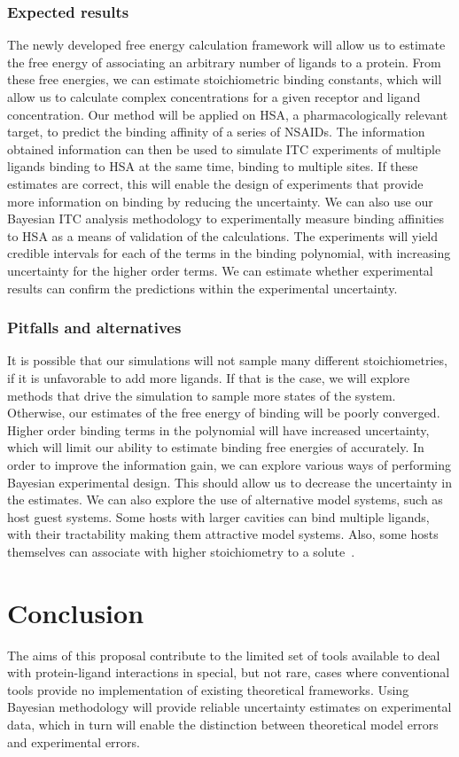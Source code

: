 \documentclass[10pt,final]{article}
\begin{document}
\subsubsection*{Expected results}
The newly developed free energy calculation framework will allow us to estimate the free energy of associating an arbitrary number of ligands to a protein.
%
From these free energies, we can estimate stoichiometric binding constants, which will allow us to calculate complex concentrations for a given receptor and ligand concentration.
%
Our method will be applied on HSA, a pharmacologically relevant target, to predict the binding affinity of a series of NSAIDs. 
%
The information obtained information can then be used to simulate ITC experiments of multiple ligands binding to HSA at the same time, binding to multiple sites.
%
If these estimates are correct, this will enable the design of experiments that provide more information on binding by reducing the uncertainty.
%
We can also use our Bayesian ITC analysis methodology to experimentally measure binding affinities to HSA as a means of validation of the calculations.
%
The experiments will yield credible intervals for each of the terms in the binding polynomial, with increasing uncertainty for the higher order terms.
%
We can estimate whether experimental results can confirm the predictions within the experimental uncertainty.

\subsubsection*{Pitfalls and alternatives}
It is possible that our simulations will not sample many different stoichiometries, if it is unfavorable to add more ligands.
%
If that is the case, we will explore methods that drive the simulation to sample more states of the system.
%
Otherwise, our estimates of the free energy of binding will be poorly converged.
%
Higher order binding terms in the polynomial will have increased uncertainty, which will limit our ability to estimate binding free energies of accurately.
%
In order to improve the information gain, we can explore various ways of performing Bayesian experimental design.
%
This should allow us to decrease the uncertainty in the estimates.
%
We can also explore the use of alternative model systems, such as host guest systems. 
%
Some hosts with larger cavities can bind multiple ligands, with their tractability making them attractive model systems.
%
Also, some hosts themselves can associate with higher stoichiometry to a solute~\autocite{Armstrong1986a}.

\section*{Conclusion}
The aims of this proposal contribute to the limited set of tools available to deal with protein-ligand interactions in special, but not rare, cases where conventional tools provide no implementation of existing theoretical frameworks. Using Bayesian methodology will provide reliable uncertainty estimates on experimental data, which in turn will enable the distinction between theoretical model errors and experimental errors.

\setlength{\emergencystretch}{1em}
\printbibliography
\end{document}
